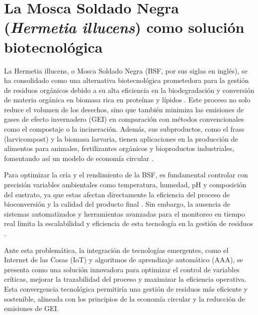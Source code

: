 \section{La Mosca Soldado Negra (\textit{Hermetia illucens}) como solución biotecnológica}
La Hermetia illucens, o Mosca Soldado Negra (BSF, por sus siglas en inglés), se ha consolidado como una alternativa biotecnológica prometedora para la gestión de residuos orgánicos debido a su alta eficiencia en la biodegradación y conversión de materia orgánica en biomasa rica en proteínas y lípidos \parencite{barragan2017nutritional}. Este proceso no solo reduce el volumen de los desechos, sino que también minimiza las emisiones de gases de efecto invernadero (GEI) en comparación con métodos convencionales como el compostaje o la incineración. Además, sus subproductos, como el frass (larvicompost) y la biomasa larvaria, tienen aplicaciones en la producción de alimentos para animales, fertilizantes orgánicos y bioproductos industriales, fomentando así un modelo de economía circular \parencite{Diener2011,salamEffectDifferentEnvironmental2022,brunoValorizationOrganicWaste2025,koyunogluBiofuelProductionUtilizing2024,suryatiLauricAcidBlack2023,siddiquiEnhancingBioconversionRate2024,hamamAdvancesInsectIndustry2024,sarangiFoodWasteFood2024}.

Para optimizar la cría y el rendimiento de la BSF, es fundamental controlar con precisión variables ambientales como temperatura, humedad, pH y composición del sustrato, ya que estas afectan directamente la eficiencia del proceso de bioconversión y la calidad del producto final \parencite{salamEffectDifferentEnvironmental2022,belperioAssessingSubstrateUtilization2024,nayakHermetiaIllucensDiptera2024,goldEffectsRearingSystem2022}. Sin embargo, la ausencia de sistemas automatizados y herramientas avanzadas para el monitoreo en tiempo real limita la escalabilidad y eficiencia de esta tecnología en la gestión de residuos \parencite{surendraRethinkingOrganicWastes2020}.

Ante esta problemática, la integración de tecnologías emergentes, como el Internet de las Cosas (IoT) y algoritmos de aprendizaje automático (AAA), se presenta como una solución innovadora para optimizar el control de variables críticas, mejorar la trazabilidad del proceso y maximizar la eficiencia operativa. Esta convergencia tecnológica permitiría una gestión de residuos más eficiente y sostenible, alineada con los principios de la economía circular y la reducción de emisiones de GEI.